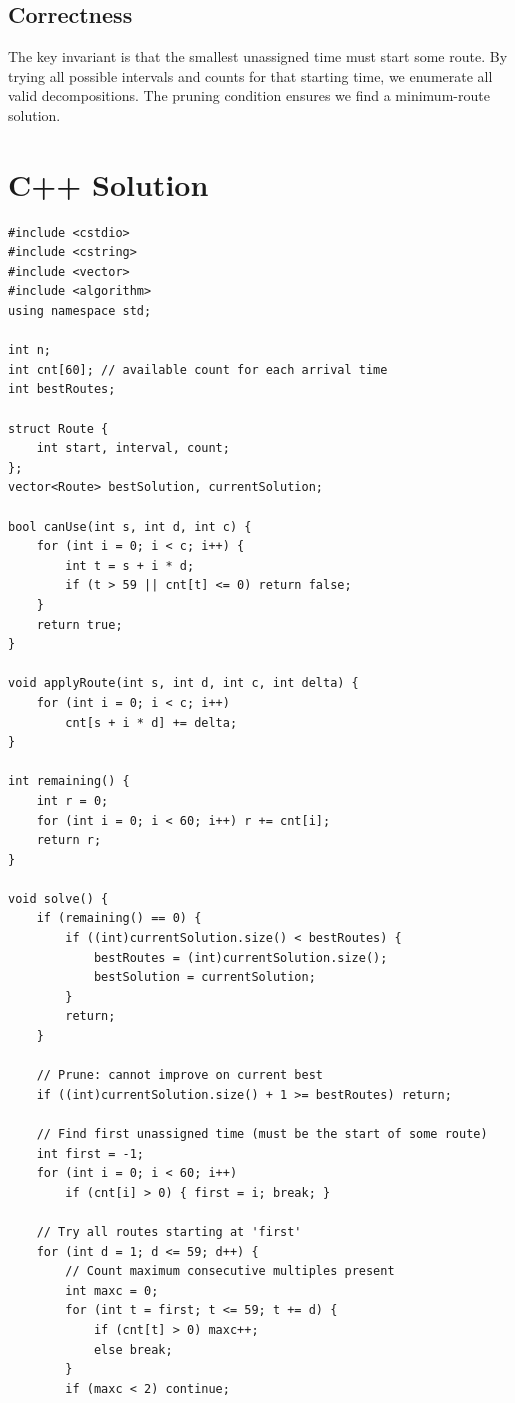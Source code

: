 \documentclass[11pt,a4paper]{article}
\begin{document}
\subsection{Correctness}

The key invariant is that the smallest unassigned time must start some route.
By trying all possible intervals and counts for that starting time, we enumerate
all valid decompositions. The pruning condition ensures we find a minimum-route solution.

\section{C++ Solution}

\begin{lstlisting}
#include <cstdio>
#include <cstring>
#include <vector>
#include <algorithm>
using namespace std;

int n;
int cnt[60]; // available count for each arrival time
int bestRoutes;

struct Route {
    int start, interval, count;
};
vector<Route> bestSolution, currentSolution;

bool canUse(int s, int d, int c) {
    for (int i = 0; i < c; i++) {
        int t = s + i * d;
        if (t > 59 || cnt[t] <= 0) return false;
    }
    return true;
}

void applyRoute(int s, int d, int c, int delta) {
    for (int i = 0; i < c; i++)
        cnt[s + i * d] += delta;
}

int remaining() {
    int r = 0;
    for (int i = 0; i < 60; i++) r += cnt[i];
    return r;
}

void solve() {
    if (remaining() == 0) {
        if ((int)currentSolution.size() < bestRoutes) {
            bestRoutes = (int)currentSolution.size();
            bestSolution = currentSolution;
        }
        return;
    }

    // Prune: cannot improve on current best
    if ((int)currentSolution.size() + 1 >= bestRoutes) return;

    // Find first unassigned time (must be the start of some route)
    int first = -1;
    for (int i = 0; i < 60; i++)
        if (cnt[i] > 0) { first = i; break; }

    // Try all routes starting at 'first'
    for (int d = 1; d <= 59; d++) {
        // Count maximum consecutive multiples present
        int maxc = 0;
        for (int t = first; t <= 59; t += d) {
            if (cnt[t] > 0) maxc++;
            else break;
        }
        if (maxc < 2) continue;


\end{lstlisting}
\end{document}
